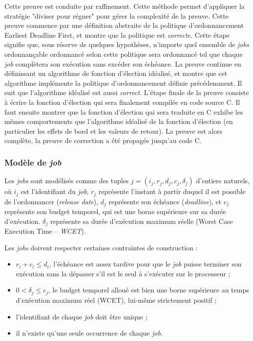 	Cette preuve est conduite par raffinement. Cette méthode permet d'appliquer la stratégie "diviser pour régner" pour gérer la complexité de la preuve.
	Cette preuve commence par une définition abstraite de la politique d'ordonnancement Earliest Deadline First, et montre que la politique est \emph{correcte}. Cette étape signifie que, sous réserve de quelques hypothèses, n'importe quel ensemble de \emph{jobs} ordonnançable ordonnancé selon cette politique sera ordonnancé tel que chaque \emph{job} complètera son exécution sans excéder son échéance.
	La preuve continue en définissant un algorithme de fonction d'élection idéalisé, et montre que cet algorithme implémente la politique d'ordonnancement définie précédemment. Il suit que l'algorithme idéalisé est aussi \emph{correct}.
	L'étape finale de la preuve consiste à écrire la fonction d'élection qui sera finalement compilée en code source C. Il faut ensuite montrer que la fonction d'élection qui sera traduite en C exhibe les mêmes comportements que l'algorithme idéalisé de la fonction d'élection (en particulier les effets de bord et les valeurs de retour). La preuve est alors complète, la preuve de correction a été propagée jusqu'au code C.

	\subsubsection{Modèle de \emph{job}}
	\label{sec:jobmodel}
	Les \emph{jobs} sont modélisés comme des tuples $j = (i_j, r_j,d_j,c_j, \delta_j)$ d'entiers naturels, où $i_j$ est l'identifiant du \emph{job}, $r_j$ représente l'instant à partir duquel il est possible de l'ordonnancer (\emph{release date}), $d_j$ représente son échéance (\emph{deadline}), et $c_j$ représente son budget temporel, qui est une borne supérieure sur sa durée d'exécution. $\delta_j$ représente sa durée d'exécution maximum réelle (Worst Case Execution Time -- \emph{WCET}).

	Les \emph{jobs} doivent respecter certaines contraintes de construction :
	\begin{itemize}
		\item $r_i + c_i \leq d_i$, l'échéance est assez tardive pour que le \emph{job} puisse terminer son exécution sans la dépasser s'il est le seul à s'exécuter sur le processeur ;
		\item $0 < \delta_j \leq c_j$, le budget temporel alloué est bien une borne supérieure au temps d'exécution maximum réel (WCET), lui-même strictement positif ;
		\item l'identifiant de chaque \emph{job} doit être unique ;
		\item il n'existe qu'une seule occurrence de chaque \emph{job}.
	\end{itemize}

